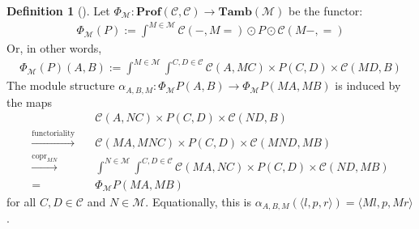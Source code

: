 \documentclass[11pt,a4paper]{article}
\theoremstyle{plain}
\theoremstyle{definition}
\newtheorem{definition}[theorem]{Definition}
\newcommand{\C}{\mathscr{C}}
\newcommand{\M}{\mathscr{M}}
\newcommand{\Pastro}{\Phi}
\newcommand{\Prof}{\mathbf{Prof}}
\newcommand{\Tamb}{\mathbf{Tamb}}
\DeclareMathOperator{\copr}{copr}
\begin{document}
\begin{definition}[{\cite[Section 5]{Doubles}}]
Let $\Pastro_\M : \Prof(\C, \C) \to \Tamb(\M)$ be the functor:
\begin{align*}
\Pastro_\M(P) := \int^{M \in \M}  \C(-, M{=}) \odot P \odot \C(M-, {=}) 
\end{align*}
Or, in other words, 
\begin{align*}
\Pastro_\M(P)(A,B) := \int^{M \in \M} \int^{C,D \in \C} \C(A, MC) \times P(C,D) \times  \C(MD, B)
\end{align*}
The module structure $\alpha_{A,B,M} : \Pastro_\M P(A,B) \to \Pastro_\M P (MA, MB)
$ is induced by the maps
\begin{align*}
&\C(A, NC) \times P(C,D) \times  \C(ND, B) \\
\xrightarrow{\text{functoriality}} \quad& \C(MA, MNC) \times P(C,D) \times  \C(MND, MB) \\
\xrightarrow{\copr_{MN}} \quad&\int^{N \in \M} \int^{C,D \in \C} \C(MA, NC) \times P(C,D) \times  \C(ND, MB) \\
= \quad&\Pastro_\M P (MA, MB)
\end{align*}
for all $C, D \in \C$ and $N \in \M$. Equationally, this is $\alpha_{A,B,M}(\langle l, p, r \rangle) = \langle Ml, p, Mr \rangle$.
\end{definition}
\end{document}
